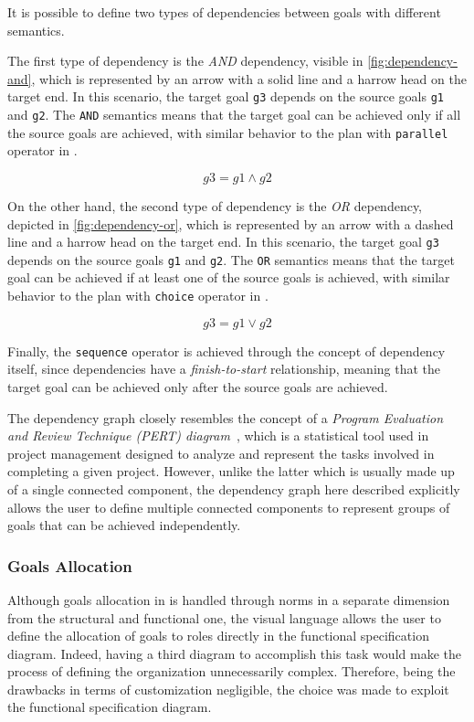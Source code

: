It is possible to define two types of dependencies between goals with different semantics.

The first type of dependency is the \textit{AND} dependency, visible in \cref{fig:dependency-and}, which is represented by an arrow with a solid line and a harrow head on the target end.
In this scenario, the target goal \texttt{g3} depends on the source goals \texttt{g1} and \texttt{g2}.
The \texttt{AND} semantics means that the target goal can be achieved only if all the source goals are achieved, with similar behavior to the plan with \texttt{parallel} operator in \moise{}.

$$g3 = g1 \wedge g2$$

On the other hand, the second type of dependency is the \textit{OR} dependency, depicted in \cref{fig:dependency-or}, which is represented by an arrow with a dashed line and a harrow head on the target end. In this scenario, the target goal \texttt{g3} depends on the source goals \texttt{g1} and \texttt{g2}. The \texttt{OR} semantics means that the target goal can be achieved if at least one of the source goals is achieved, with similar behavior to the plan with \texttt{choice} operator in \moise{}.

$$g3 = g1 \vee g2$$

Finally, the \texttt{sequence} operator is achieved through the concept of dependency itself, since dependencies have a \textit{finish-to-start} relationship, meaning that the target goal can be achieved only after the source goals are achieved.

The dependency graph closely resembles the concept of a \textit{Program Evaluation and Review Technique (PERT) diagram}~\cite{donald1972}, which is a statistical tool used in project management designed to analyze and represent the tasks involved in completing a given project.
However, unlike the latter which is usually made up of a single connected component, the dependency graph here described explicitly allows the user to define multiple connected components to represent groups of goals that can be achieved independently.

\subsubsection{Goals Allocation}
Although goals allocation in \moise{} is handled through norms in a separate dimension from the structural and functional one, the visual language allows the user to define the allocation of goals to roles directly in the functional specification diagram.
Indeed, having a third diagram to accomplish this task would make the process of defining the organization unnecessarily complex.
Therefore, being the drawbacks in terms of customization negligible, the choice was made to exploit the functional specification diagram.

